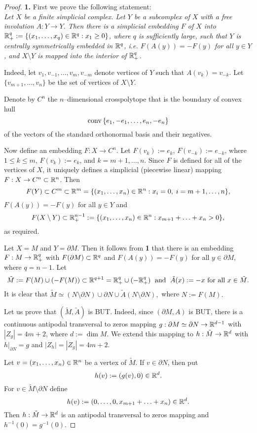 \documentclass[a4paper,12pt]{article}
\newcommand{\conv}{\mathop{\rm conv}\nolimits}
\begin{document}
\begin{proof} {\bf 1.} First we prove the following statement:\\
{\it
 Let $X$ be a finite simplicial complex. Let $Y$ be a subcomplex of $X$ with a free involution $A:Y\to Y$. Then there is a simplicial embedding $F$ of $X$ into 
${\Bbb R}^q_+:=\{(x_1,\ldots,x_q)\in{\Bbb R}^q: x_1\ge 0\}$, where $q$ is sufficiently large,  such that $Y$ is centrally symmetrically embedded in ${\Bbb R}^q$, i.e. $F(A(y))=-F(y)$ for all $y\in Y$, and $X\setminus Y$ is mapped into the interior of  ${\Bbb R}^q_+$.}
	
Indeed, let $v_1,v_{-1},\ldots,v_m,v_{-m}$ denote vertices of $Y$ such that $A(v_k)=v_{-k}$. Let $\{v_{m+1},\ldots, v_n\}$ be the set of vertices of $X\setminus Y$.

Denote by $C^n$ the $n$--dimensional crosspolytope that is the boundary of convex hull
$$
\conv{\{e_1,-e_1,\ldots,e_n,-e_n\}}
$$
of the vectors of the standard orthonormal basis and their negatives.

Now define an embedding $F:X\to C^n$. Let $F(v_k):=e_k$, $F(v_{-k}):=e_{-k}$, where $1\le k\le m$, $F(v_k):=e_k$, and $k=m+1,\ldots,n$.
Since $F$ is defined for all of the vertices of $X$,  it uniquely defines a simplicial (piecewise linear) mapping $F:X\to C^n\subset {\Bbb R}^n$.
Then
$$F(Y)\subset C^m\subset{\Bbb R}^m=\{(x_1,\ldots,x_n)\in {\Bbb R}^n: x_i=0, \; i=m+1,\ldots,n \},$$
$F(A(y))=-F(y)$ for all $y\in Y$  and
$$
F(X\setminus Y)\subset {\Bbb R}^{n-1}_+:=\{(x_1,\ldots,x_n)\in {\Bbb R}^n: x_{m+1}+\ldots+x_n>0\},
$$
as required.

\medskip
	
	Let $X=M$ and $Y=\partial M$. Then it follows from {\bf 1} that there is an embedding  $F:M\to{\Bbb R}^q_+$ with $F(\partial M)\subset {\Bbb R}^q$ and $F(A(y))=-F(y)$ for all $y\in \partial M$, where $q=n-1$.
Let
$$
\tilde M:=F(M)\cup(-F(M))\subset{\Bbb R}^{q+1}={\Bbb R}^q_+\cup (-{\Bbb R}^q_+) \; \mbox{ and } \; \tilde A(x):=-x \mbox{ for all } x\in\tilde M.
$$
	 It is clear that $\tilde M\simeq (N\setminus\partial N)\cup \partial N \cup \tilde A(N\setminus\partial N),$ where $N:=F(M).$
	
\medskip

	Let us prove that $(\tilde M,\tilde A)$ is BUT. Indeed, since $(\partial M,A)$ is BUT, there is a continuous antipodal transversal to zeros mapping $g:\partial M\simeq\partial N \to {\Bbb R}^{d-1}$ with $|Z_g|=4m+2$, where $d:=\dim{M}.$ We extend this mapping to  $h:\tilde M \to {\Bbb R}^{d}$  with $h|_{\partial N}=g$ and $|Z_h|=|Z_g|=4m+2$.


Let $v=(x_1,\ldots,x_{n})\in{\Bbb R}^{n}$ be a vertex of $\tilde M$. If $v\in\partial N$, then put
$$
h(v):=(g(v),0)\in {\Bbb R}^{d}.
$$
For $v\in\tilde M\setminus\partial N$ define
$$
h(v):=(0,\ldots,0,x_{m+1}+\ldots+x_n)\in{\Bbb R}^{d}.
$$
Then $h:\tilde M\to{\Bbb R}^{d}$ is an antipodal transversal to zeros mapping and $h^{-1}(0)=g^{-1}(0)$.
\end{proof}
\end{document}
